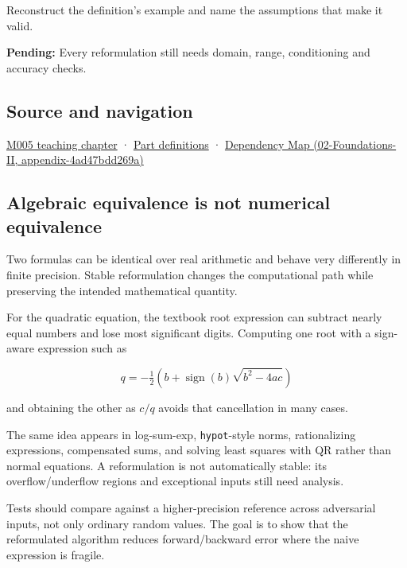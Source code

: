 Reconstruct the definition's example and name the assumptions that make it valid.

\textbf{Pending:} Every reformulation still needs domain, range, conditioning and accuracy checks.

\subsection{Source and navigation}\label{appendix-d7f8ba961670-source-and-navigation}

\hyperref[01-foundations-i-ch001-when-arithmetic-meets-uncertainty]{M005 teaching chapter} · \hyperref[appendix-fd090d982a15-m005---parts-77-88]{Part definitions} · \href{../02-Foundations-II/main.pdf\#nameddest=appendix-4ad47bdd269a}{Dependency Map (02-Foundations-II, appendix-4ad47bdd269a)}

\subsection{Algebraic equivalence is not numerical equivalence}\label{appendix-d7f8ba961670-algebraic-equivalence-is-not-numerical-equivalence}

Two formulas can be identical over real arithmetic and behave very differently in finite precision. Stable reformulation changes the computational path while preserving the intended mathematical quantity.

For the quadratic equation, the textbook root expression can subtract nearly equal numbers and lose most significant digits. Computing one root with a sign-aware expression such as

\[
q=-\tfrac12\left(b+\operatorname{sign}(b)\sqrt{b^2-4ac}\right)
\]

and obtaining the other as \(c/q\) avoids that cancellation in many cases.

The same idea appears in log-sum-exp, \texttt{hypot}-style norms, rationalizing expressions, compensated sums, and solving least squares with QR rather than normal equations. A reformulation is not automatically stable: its overflow/underflow regions and exceptional inputs still need analysis.

Tests should compare against a higher-precision reference across adversarial inputs, not only ordinary random values. The goal is to show that the reformulated algorithm reduces forward/backward error where the naive expression is fragile.
